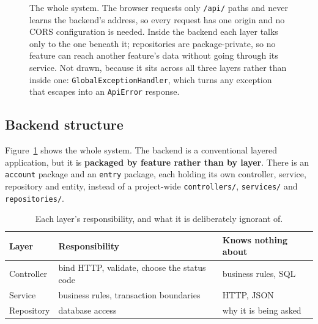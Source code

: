 \documentclass[11pt,a4paper]{article}
\begin{document}
\begin{figure}[htbp]
\caption{The whole system. The browser requests only \texttt{/api/} paths and never learns the
backend's address, so every request has one origin and no CORS configuration is needed. Inside the
backend each layer talks only to the one beneath it; repositories are package-private, so no
feature can reach another feature's data without going through its service. Not drawn, because it
sits across all three layers rather than inside one: \texttt{GlobalExceptionHandler}, which turns
any exception that escapes into an \texttt{ApiError} response.}
\label{fig:architecture}
\end{figure}

\subsection{Backend structure}

Figure~\ref{fig:architecture} shows the whole system. The backend is a conventional layered
application, but it is \textbf{packaged by feature rather than by layer}. There is an \texttt{account} package and an \texttt{entry} package, each holding
its own controller, service, repository and entity, instead of a project-wide \texttt{controllers/},
\texttt{services/} and \texttt{repositories/}.

\begin{table}[htbp]
\centering\small
\begin{tabular}{@{}lll@{}}
\toprule
\textbf{Layer} & \textbf{Responsibility} & \textbf{Knows nothing about} \\
\midrule
Controller & bind HTTP, validate, choose the status code & business rules, SQL \\
Service    & business rules, transaction boundaries      & HTTP, JSON \\
Repository & database access                             & why it is being asked \\
\bottomrule
\end{tabular}
\caption{Each layer's responsibility, and what it is deliberately ignorant of.}
\end{table}
\end{document}
